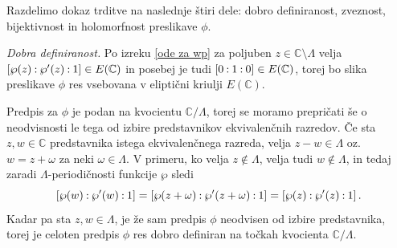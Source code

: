 \documentclass[mat1]{fmfdelo}
\numberwithin{equation}{section}
\newcommand{\C}{\mathbb C}
\newcommand{\oio}{\pcoor{0: 1 : 0}}
\newcommand{\om}{\omega}
\newcommand{\torus}{\C/\Lambda}
\newcommand{\pcoor}[1]{%
\begingroup\lccode`~=`: \lowercase{\endgroup
\edef~}{\mathbin{\mathchar\the\mathcode`:}\nobreak}%
\left[%
\begingroup
\mathcode`:=\string"8000
#1%
\endgroup
\right]%
}
\newcommand{\oz}{oz.\ }
\theoremstyle{definition}
\begin{document}
\begin{dokaz}
    Razdelimo dokaz trditve na naslednje štiri dele: dobro definiranost, zveznost, bijektivnost in holomorfnost preslikave $\phi$.

    \emph{Dobra definiranost.} 
    Po izreku \ref{ode za wp} za poljuben $z \in \C\setminus\Lambda$ velja $\pcoor{\wp(z) : \wp'(z) : 1} \in E(\C)$ in posebej je tudi $\oio \in E(\C)$, torej bo slika preslikave $\phi$ res vsebovana v eliptični kriulji $E(\C)$. 
    
    Predpis za $\phi$ je podan na kvocientu $\torus$, torej se moramo prepričati še o neodvisnosti le tega od izbire predstavnikov ekvivalenčnih razredov. Če sta $z,w \in \C$ predstavnika istega ekvivalenčnega razreda, velja $z - w \in \Lambda$ \oz $w = z + \om$ za neki $\om \in \Lambda$. V primeru, ko velja $z \not\in \Lambda$, velja tudi $w \not\in \Lambda$, in tedaj zaradi $\Lambda$-periodičnosti funkcije $\wp$ sledi
    \[
        \pcoor{\wp(w) : \wp'(w) : 1} = 
        \pcoor{\wp(z + \om) : \wp'(z  + \om) : 1} =
        \pcoor{\wp(z) : \wp'(z) : 1}. 
    \]
    Kadar pa sta $z, w \in \Lambda$, je že sam predpis $\phi$ neodvisen od izbire predstavnika, torej je celoten predpis $\phi$ res dobro definiran na točkah kvocienta $\torus$. 


\end{dokaz}
\end{document}
